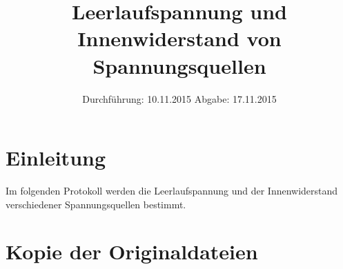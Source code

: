 

\subject{V301}
\title{Leerlaufspannung und Innenwiderstand von Spannungsquellen}
\date{
  Durchführung: 10.11.2015
  \hspace{3em}
  Abgabe: 17.11.2015
}



\maketitle
\thispagestyle{empty}
\tableofcontents
\newpage

\section{Einleitung}
Im folgenden Protokoll werden die Leerlaufspannung und der Innenwiderstand
verschiedener Spannungsquellen bestimmt.






\nocite{anleitung}

\printbibliography

\newpage

\appendix

\section{Kopie der Originaldateien}


